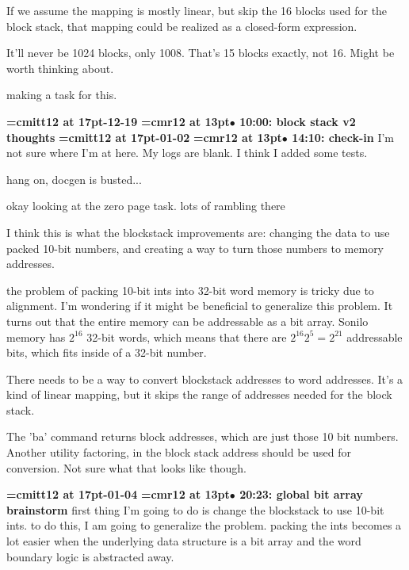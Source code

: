 If we assume the mapping is mostly linear, but skip the 16 blocks used for the block stack, that mapping could be realized as a closed-form expression.
\par

It'll never be 1024 blocks, only 1008. That's 15 blocks exactly, not 16. Might be worth thinking about.
\par

making a task for this.
\par

{\medskip\noindent\bf\font\titlefont=cmitt12 at 17pt-12-19}\medskip
{\smallskip\noindent\bf\font\titlefont=cmr12 at 13pt\titlefont $\bullet$ 10:00: block stack v2 thoughts}\smallskip
{\medskip\noindent\bf\font\titlefont=cmitt12 at 17pt-01-02}\medskip
{\smallskip\noindent\bf\font\titlefont=cmr12 at 13pt\titlefont $\bullet$ 14:10: check-in}\smallskip
I'm not sure where I'm at here. My logs are blank. I think I added some tests.
\par

hang on, docgen is busted... 
\par

okay looking at the zero page task. lots of rambling there
\par

I think this is what the blockstack improvements are: changing the data to use packed 10-bit numbers, and creating a way to turn those numbers to memory addresses.
\par

the problem of packing 10-bit ints into 32-bit word memory is tricky due to alignment. I'm wondering if it might be beneficial to generalize this problem. It turns out that the entire memory can be addressable as a bit array. Sonilo memory has $2^16$ 32-bit words, which means that there are $2^16 2^5 = 2^21$ addressable bits, which fits inside of a 32-bit number.
\par

There needs to be a way to convert blockstack addresses to word addresses. It's a kind of linear mapping, but it skips the range of addresses needed for the block stack.
\par

The 'ba' command returns block addresses, which are just those 10 bit numbers. Another utility factoring, in the block stack address should be used for conversion. Not sure what that looks like though.
\par

{\medskip\noindent\bf\font\titlefont=cmitt12 at 17pt-01-04}\medskip
{\smallskip\noindent\bf\font\titlefont=cmr12 at 13pt\titlefont $\bullet$ 20:23: global bit array brainstorm}\smallskip
first thing I'm going to do is change the blockstack to use 10-bit ints. to do this, I am going to generalize the problem. packing the ints becomes a lot easier when the underlying data structure is a bit array and the word boundary logic is abstracted away.
\par


